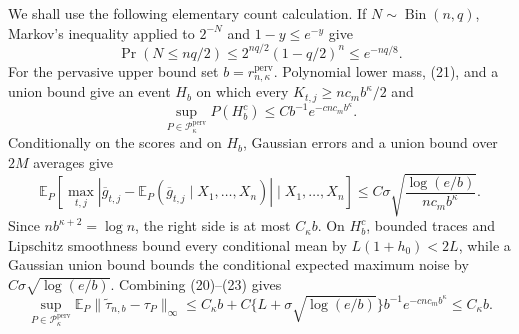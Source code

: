 We shall use the following elementary count calculation.  If \(N\sim\operatorname{Bin}(n,q)\), Markov's inequality applied to \(2^{-N}\) and \(1-y\le e^{-y}\) give
\[
 \Pr(N\le nq/2)
 \le2^{nq/2}(1-q/2)^n
 \le e^{-nq/8}. \tag{21}
\]
For the pervasive upper bound set \(b=r_{n,\kappa}^{\mathrm{perv}}\).  Polynomial lower mass, (21), and a union bound give an event \(H_b\) on which every \(K_{t,j}\ge nc_mb^{\kappa}/2\) and
\[
 \sup_{P\in\mathcal P_{\kappa}^{\mathrm{perv}}}P(H_b^c)
 \le Cb^{-1}e^{-cnc_mb^{\kappa}}. \tag{22}
\]
Conditionally on the scores and on \(H_b\), Gaussian errors and a union bound over \(2M\) averages give
\[
 \mathbb E_P\left[
 \max_{t,j}|\overline g_{t,j}-\mathbb E_P(\overline g_{t,j}\mid X_1,\ldots,X_n)|
 \mid X_1,\ldots,X_n\right]
 \le C\sigma\sqrt{\frac{\log(e/b)}{nc_mb^{\kappa}}}. \tag{23}
\]
Since \(nb^{\kappa+2}=\log n\), the right side is at most \(C_{\kappa}b\).  On \(H_b^c\), bounded traces and Lipschitz smoothness bound every conditional mean by \(L(1+h_0)<2L\), while a Gaussian union bound bounds the conditional expected maximum noise by \(C\sigma\sqrt{\log(e/b)}\).  Combining (20)--(23) gives
\[
 \sup_{P\in\mathcal P_{\kappa}^{\mathrm{perv}}}
 \mathbb E_P\|\widetilde\tau_{n,b}-\tau_P\|_{\infty}
 \le C_{\kappa}b+C\{L+\sigma\sqrt{\log(e/b)}\}b^{-1}e^{-cnc_mb^{\kappa}}
 \le C_{\kappa}b. \tag{24}
\]

